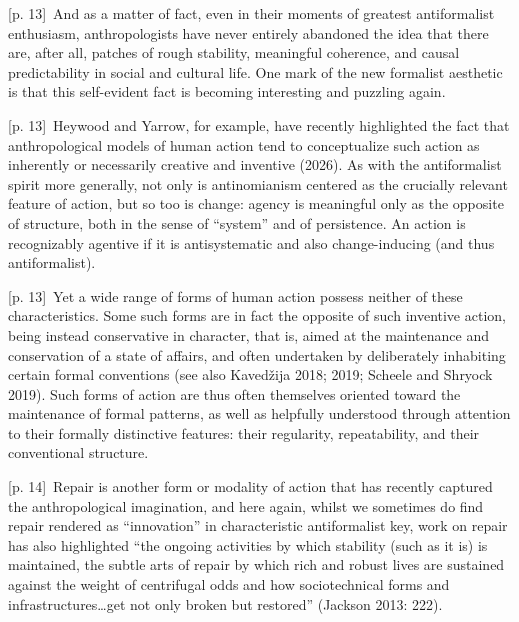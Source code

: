 \documentclass[10pt,a4paper]{article}
\begin{document}
{\scriptsize\color{gray} [p. 13]}\ And as a matter of fact, even in their moments of greatest antiformalist enthusiasm, anthropologists have never entirely abandoned the idea that there are, after all, patches of rough stability, meaningful coherence, and causal predictability in social and cultural life. One mark of the new formalist aesthetic is that this self-evident fact is becoming interesting and puzzling again.\par
{\scriptsize\color{gray} [p. 13]}\ Heywood and Yarrow, for example, have recently highlighted the fact that anthropological models of human action tend to conceptualize such action as inherently or necessarily creative and inventive (2026). As with the antiformalist spirit more generally, not only is antinomianism centered as the crucially relevant feature of action, but so too is change: agency is meaningful only as the opposite of structure, both in the sense of “system” and of persistence. An action is recognizably agentive if it is antisystematic and also change-inducing (and thus antiformalist).\par
{\scriptsize\color{gray} [p. 13]}\ Yet a wide range of forms of human action possess neither of these characteristics. Some such forms are in fact the opposite of such inventive action, being instead conservative in character, that is, aimed at the maintenance and conservation of a state of affairs, and often undertaken by deliberately inhabiting certain formal conventions (see also Kavedžija 2018; 2019; Scheele and Shryock 2019). Such forms of action are thus often themselves oriented toward the maintenance of formal patterns, as well as helpfully understood through attention to their formally distinctive features: their regularity, repeatability, and their conventional structure.\par
{\scriptsize\color{gray} [p. 14]}\ Repair is another form or modality of action that has recently captured the anthropological imagination, and here again, whilst we sometimes do find repair rendered as “innovation” in characteristic antiformalist key, work on repair has also highlighted “the ongoing activities by which stability (such as it is) is maintained, the subtle arts of repair by which rich and robust lives are sustained against the weight of centrifugal odds and how sociotechnical forms and infrastructures…get not only broken but restored” (Jackson 2013: 222).\par
\end{document}
